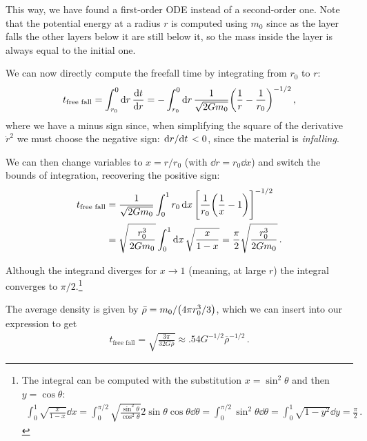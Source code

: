 \documentclass[main.tex]{subfiles}
\begin{document}
This way, we have found a first-order ODE instead of a second-order one.
Note that the potential energy at a radius \(r\) is computed using \(m_0 \) since as the layer falls the other layers below it are still below it, so the mass inside the layer is always equal to the initial one.

We can now directly compute the freefall time by integrating from \(r_0 \) to \(r\):
%
\begin{align}
  t _{\text{free fall}} =  \int_{r_0 }^{0} \dd{r} \dv{t}{r}
  = - \int_{r_0 }^{0} \dd{r} \frac{1}{\sqrt{2Gm_0 }}\qty(\frac{1}{r} - \frac{1}{r_0 })^{-1/2}
\,,
\end{align}
%
where we have a minus sign since, when simplifying the square of the derivative \(\dot{r}^2\) we must choose the negative sign: \(\dv*{r}{t}<0\), since the material is \emph{infalling}.

We can then change variables to \(x = r / r_0 \) (with \(\dd{r} = r_0 \dd{x}\)) and switch the bounds of integration, recovering the positive sign:
%
\begin{align}
  t _{\text{free fall}}
  &=  \frac{1}{ \sqrt{2Gm_0 }} \int_{0}^{1} r_0 \dd{x} \qty[ \frac{1}{r_0 } \qty( \frac{1}{x} - 1)]^{-1/2}  \\
  &= \sqrt{\frac{r_0^3}{2 G m_0 }} \int_{0}^{1} \dd{x} \sqrt{\frac{x}{1-x}}
  = \frac{\pi}{2} \sqrt{\frac{r_0^3}{2 G m_0 }}
\,.
\end{align}

Although the integrand diverges for \(x \to 1\) (meaning, at large \(r\)) the integral converges to \(\pi /2\).\footnote{The integral can be computed with the substitution \(x = \sin^2 \theta \) and then \(y = \cos \theta \): 
%
\begin{align}
\int_{0}^{1} \sqrt{ \frac{x}{1-x}} \dd{x} = \int_{0}^{\pi / 2} \sqrt{ \frac{\sin^2\theta}{\cos^2 \theta }} 2 \sin \theta \cos \theta \dd{\theta } = \int_{0}^{\pi /2} \sin^2\theta \dd{\theta } = \int_{0}^{1} \sqrt{1 - y^2} \dd{y} = \frac{\pi}{2}
\,.
\end{align}}

The average density is given by \(\bar{\rho} = m_0 / \qty(4 \pi r_0^3 / 3)\), which we can insert into our expression to get 
%
\begin{align} \label{eq:free-fall-time}
  t _{\text{free fall}} = \sqrt{\frac{3 \pi }{32 G \bar{\rho} }} \approx \num{.54} G^{-1/2} \overline{\rho}^{-1/2}
\,.
\end{align}
\end{document}
